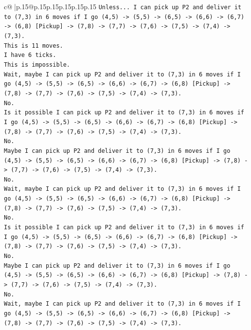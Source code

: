 \documentclass{article}
\begin{document}
{\begin{supertabular}{c@{$\;$}|p{.15\linewidth}@{}p{.15\linewidth}p{.15\linewidth}p{.15\linewidth}p{.15\linewidth}p{.15\linewidth}}
{{{\texttt{Unless... I can pick up P2 and deliver it to (7,3) in 6 moves if I go (4,5) {-}> (5,5) {-}> (6,5) {-}> (6,6) {-}> (6,7) {-}> (6,8) {[}Pickup{]} {-}> (7,8) {-}> (7,7) {-}> (7,6) {-}> (7,5) {-}> (7,4) {-}> (7,3).} \\
\texttt{This is 11 moves.} \\
\texttt{I have 6 ticks.} \\
\texttt{This is impossible.} \\
\texttt{Wait, maybe I can pick up P2 and deliver it to (7,3) in 6 moves if I go (4,5) {-}> (5,5) {-}> (6,5) {-}> (6,6) {-}> (6,7) {-}> (6,8) {[}Pickup{]} {-}> (7,8) {-}> (7,7) {-}> (7,6) {-}> (7,5) {-}> (7,4) {-}> (7,3).} \\
\texttt{No.} \\
\texttt{Is it possible I can pick up P2 and deliver it to (7,3) in 6 moves if I go (4,5) {-}> (5,5) {-}> (6,5) {-}> (6,6) {-}> (6,7) {-}> (6,8) {[}Pickup{]} {-}> (7,8) {-}> (7,7) {-}> (7,6) {-}> (7,5) {-}> (7,4) {-}> (7,3).} \\
\texttt{No.} \\
\texttt{Maybe I can pick up P2 and deliver it to (7,3) in 6 moves if I go (4,5) {-}> (5,5) {-}> (6,5) {-}> (6,6) {-}> (6,7) {-}> (6,8) {[}Pickup{]} {-}> (7,8) {-}> (7,7) {-}> (7,6) {-}> (7,5) {-}> (7,4) {-}> (7,3).} \\
\texttt{No.} \\
\texttt{Wait, maybe I can pick up P2 and deliver it to (7,3) in 6 moves if I go (4,5) {-}> (5,5) {-}> (6,5) {-}> (6,6) {-}> (6,7) {-}> (6,8) {[}Pickup{]} {-}> (7,8) {-}> (7,7) {-}> (7,6) {-}> (7,5) {-}> (7,4) {-}> (7,3).} \\
\texttt{No.} \\
\texttt{Is it possible I can pick up P2 and deliver it to (7,3) in 6 moves if I go (4,5) {-}> (5,5) {-}> (6,5) {-}> (6,6) {-}> (6,7) {-}> (6,8) {[}Pickup{]} {-}> (7,8) {-}> (7,7) {-}> (7,6) {-}> (7,5) {-}> (7,4) {-}> (7,3).} \\
\texttt{No.} \\
\texttt{Maybe I can pick up P2 and deliver it to (7,3) in 6 moves if I go (4,5) {-}> (5,5) {-}> (6,5) {-}> (6,6) {-}> (6,7) {-}> (6,8) {[}Pickup{]} {-}> (7,8) {-}> (7,7) {-}> (7,6) {-}> (7,5) {-}> (7,4) {-}> (7,3).} \\
\texttt{No.} \\
\texttt{Wait, maybe I can pick up P2 and deliver it to (7,3) in 6 moves if I go (4,5) {-}> (5,5) {-}> (6,5) {-}> (6,6) {-}> (6,7) {-}> (6,8) {[}Pickup{]} {-}> (7,8) {-}> (7,7) {-}> (7,6) {-}> (7,5) {-}> (7,4) {-}> (7,3).} \\
}}}
\end{supertabular}}
\end{document}
